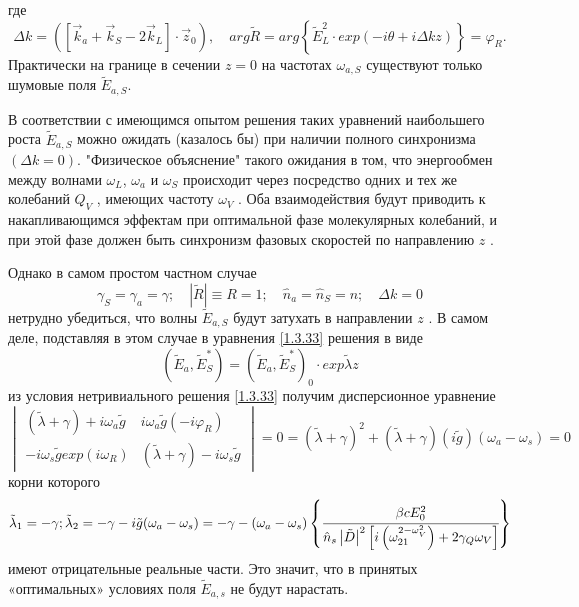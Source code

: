 \documentclass[a4paper]{article}
\begin{document}
где $$\Delta k=\left(\left[\vec{k}_{a}+\vec{k}_{S}-2\vec{k}_{L}\right]\cdot\vec{z}_{0}\right),\quad arg\tilde{R}=arg\left\{\tilde{E}_{L}^{2}\cdot exp(-i\theta+i\Delta kz)\right\}=\varphi_{R}.$$
Практически на границе в сечении $z=0$ на частотах $\omega_{a,S}$ существуют только шумовые поля $\tilde{E}_{a,S}$. 

В соответствии с имеющимся опытом решения таких уравнений наибольшего роста $\tilde{E}_{a,S}$ можно ожидать (казалось бы) при наличии полного синхронизма $(\Delta k=0)$. "Физическое объяснение" такого ожидания в том, что энергообмен между волнами $\omega_{L}$, $\omega_{a}$ и $\omega_{S}$ происходит через посредство одних и тех же колебаний $Q_{V}$ , имеющих частоту $\omega_{V}$ . Оба взаимодействия будут приводить к накапливающимся эффектам при оптимальной фазе молекулярных колебаний, и при этой фазе должен быть синхронизм фазовых скоростей по направлению $z$ .

Однако в самом простом частном случае 
\begin{equation}
	\gamma_{S}=\gamma_{a}=\gamma;\quad\left|\tilde{R}\right|\equiv R=1;\quad\hat{n}_{a}=\hat{n}_{S}=n;\quad\Delta k=0
	\label{1.3.34}
\end{equation}
нетрудно убедиться, что волны $\tilde{E}_{a,S}$ будут затухать в направлении $z$ . В самом деле, подставляя в этом случае в уравнения \eqref{1.3.33} решения в виде 
\begin{equation}
	\left(\tilde{E}_{a},\tilde{E}_{S}^{*}\right)=\left(\tilde{E}_{a},\tilde{E}_{S}^{*}\right)_{0}\cdot exp\tilde{\lambda}z
	\label{1.3.35}
\end{equation}
из условия нетривиального решения \eqref{1.3.33} получим дисперсионное уравнение
\begin{equation}
	\begin{vmatrix}
		\left(\tilde{\lambda}+\gamma\right)+i\omega_{a}\tilde{g}& i\omega_{a}\tilde{g}(-i\varphi_{R})\\
		-i\omega_{s}\tilde{g}exp(i\omega_{R})& \left(\tilde{\lambda}+\gamma\right)-i\omega_{s}\tilde{g}
	\end{vmatrix}=0=\left(\tilde{\lambda}+\gamma\right)^{2}+\left(\tilde{\lambda}+\gamma\right)(i\tilde{g})\left(\omega_{a}-\omega_{s}\right)=0
	\label{1.3.36}
\end{equation}
корни которого 
\begin{equation}
	\tilde{\lambda}_{1}=-\gamma;\tilde{\lambda}_{2}=-\gamma-i\tilde{g}(\omega_{a}-\omega_{s})=-\gamma-(\omega_{a}-\omega_{s})\left\{\cfrac{\beta cE_{0}^{2}}{\hat{n}_{s}\left|\tilde{D}\right|^{2}\left[i\left(\omega_{21}^{2-\omega_{V}^{2}}\right)+2\gamma_{Q}\omega_{V}\right]}\right\}
	\label{1.3.37}
\end{equation}
имеют отрицательные реальные части. Это значит, что в принятых «оптимальных» условиях поля $\tilde{E}_{a,s}$ не будут нарастать. 
\end{document}
